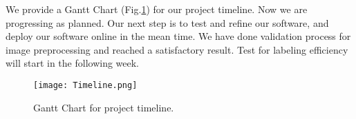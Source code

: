 We provide a Gantt Chart (Fig.\ref{fig:timeline}) for our project timeline. Now
we are progressing as planned. Our next step is to test and refine our
software, and deploy our software online in the mean time. We have done
validation process for image preprocessing and reached a satisfactory result.
Test for labeling efficiency will start in the following week.

\begin{figure}[htbp]
  \centering \texttt{[image: Timeline.png]}
  \caption{Gantt Chart for project timeline.}
  \label{fig:timeline}
\end{figure}
